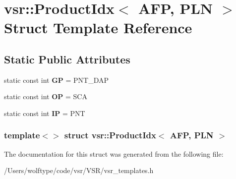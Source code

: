 \hypertarget{structvsr_1_1_product_idx_3_01_a_f_p_00_01_p_l_n_01_4}{\section{vsr\-:\-:Product\-Idx$<$ A\-F\-P, P\-L\-N $>$ Struct Template Reference}
\label{structvsr_1_1_product_idx_3_01_a_f_p_00_01_p_l_n_01_4}
}
\subsection*{Static Public Attributes}
\begin{DoxyCompactItemize}
\item 
\hypertarget{structvsr_1_1_product_idx_3_01_a_f_p_00_01_p_l_n_01_4_a7fc5e5d3ce81aefcce71566012d62044}{static const int {\bfseries G\-P} = P\-N\-T\-\_\-\-D\-A\-P}\label{structvsr_1_1_product_idx_3_01_a_f_p_00_01_p_l_n_01_4_a7fc5e5d3ce81aefcce71566012d62044}

\item 
\hypertarget{structvsr_1_1_product_idx_3_01_a_f_p_00_01_p_l_n_01_4_a498da4db56fd016b840db99b130649cf}{static const int {\bfseries O\-P} = S\-C\-A}\label{structvsr_1_1_product_idx_3_01_a_f_p_00_01_p_l_n_01_4_a498da4db56fd016b840db99b130649cf}

\item 
\hypertarget{structvsr_1_1_product_idx_3_01_a_f_p_00_01_p_l_n_01_4_a03d39031a4c3be11fe7e55991c99c961}{static const int {\bfseries I\-P} = P\-N\-T}\label{structvsr_1_1_product_idx_3_01_a_f_p_00_01_p_l_n_01_4_a03d39031a4c3be11fe7e55991c99c961}

\end{DoxyCompactItemize}
\subsubsection*{template$<$$>$ struct vsr\-::\-Product\-Idx$<$ A\-F\-P, P\-L\-N $>$}



The documentation for this struct was generated from the following file\-:\begin{DoxyCompactItemize}
\item 
/\-Users/wolftype/code/vsr/\-V\-S\-R/vsr\-\_\-templates.\-h\end{DoxyCompactItemize}
